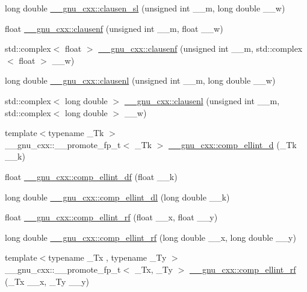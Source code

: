 \begin{DoxyCompactItemize}
\item 
long double \hyperlink{group__gnu__math__spec__func_ga6eb205278e3807367b62e07c3f39d915}{\+\_\+\+\_\+gnu\+\_\+cxx\+::clausen\+\_\+sl} (unsigned int \+\_\+\+\_\+m, long double \+\_\+\+\_\+w)
\item 
float \hyperlink{group__gnu__math__spec__func_ga9e228490e55e7936f77ae7a5ef9821dc}{\+\_\+\+\_\+gnu\+\_\+cxx\+::clausenf} (unsigned int \+\_\+\+\_\+m, float \+\_\+\+\_\+w)
\item 
std\+::complex$<$ float $>$ \hyperlink{group__gnu__math__spec__func_ga769ee593c5f1c1d8148abb9bebe50821}{\+\_\+\+\_\+gnu\+\_\+cxx\+::clausenf} (unsigned int \+\_\+\+\_\+m, std\+::complex$<$ float $>$ \+\_\+\+\_\+w)
\item 
long double \hyperlink{group__gnu__math__spec__func_gaac0a4d039044c04cd26c9b8559c441fd}{\+\_\+\+\_\+gnu\+\_\+cxx\+::clausenl} (unsigned int \+\_\+\+\_\+m, long double \+\_\+\+\_\+w)
\item 
std\+::complex$<$ long double $>$ \hyperlink{group__gnu__math__spec__func_ga6e1e9929ace5a66d970c308554473a26}{\+\_\+\+\_\+gnu\+\_\+cxx\+::clausenl} (unsigned int \+\_\+\+\_\+m, std\+::complex$<$ long double $>$ \+\_\+\+\_\+w)
\item 
{\footnotesize template$<$typename \+\_\+\+Tk $>$ }\\\+\_\+\+\_\+gnu\+\_\+cxx\+::\+\_\+\+\_\+promote\+\_\+fp\+\_\+t$<$ \+\_\+\+Tk $>$ \hyperlink{group__gnu__math__spec__func_ga2c6b6c5a44ea00f0aed05c02f1072c31}{\+\_\+\+\_\+gnu\+\_\+cxx\+::comp\+\_\+ellint\+\_\+d} (\+\_\+\+Tk \+\_\+\+\_\+k)
\item 
float \hyperlink{group__gnu__math__spec__func_ga34ac6488b0e7531d5d4b7a8e31ff864e}{\+\_\+\+\_\+gnu\+\_\+cxx\+::comp\+\_\+ellint\+\_\+df} (float \+\_\+\+\_\+k)
\item 
long double \hyperlink{group__gnu__math__spec__func_ga494931ec0a271b79f1fdcfdf929e3138}{\+\_\+\+\_\+gnu\+\_\+cxx\+::comp\+\_\+ellint\+\_\+dl} (long double \+\_\+\+\_\+k)
\item 
float \hyperlink{group__gnu__math__spec__func_ga55ae30b4f8ff15017d18a80050e14e38}{\+\_\+\+\_\+gnu\+\_\+cxx\+::comp\+\_\+ellint\+\_\+rf} (float \+\_\+\+\_\+x, float \+\_\+\+\_\+y)
\item 
long double \hyperlink{group__gnu__math__spec__func_gae1d468487f1711e91719a9c6392f3c35}{\+\_\+\+\_\+gnu\+\_\+cxx\+::comp\+\_\+ellint\+\_\+rf} (long double \+\_\+\+\_\+x, long double \+\_\+\+\_\+y)
\item 
{\footnotesize template$<$typename \+\_\+\+Tx , typename \+\_\+\+Ty $>$ }\\\+\_\+\+\_\+gnu\+\_\+cxx\+::\+\_\+\+\_\+promote\+\_\+fp\+\_\+t$<$ \+\_\+\+Tx, \+\_\+\+Ty $>$ \hyperlink{group__gnu__math__spec__func_ga78dc5f41ec8b69ed822612a72d326109}{\+\_\+\+\_\+gnu\+\_\+cxx\+::comp\+\_\+ellint\+\_\+rf} (\+\_\+\+Tx \+\_\+\+\_\+x, \+\_\+\+Ty \+\_\+\+\_\+y)

\end{DoxyCompactItemize}
